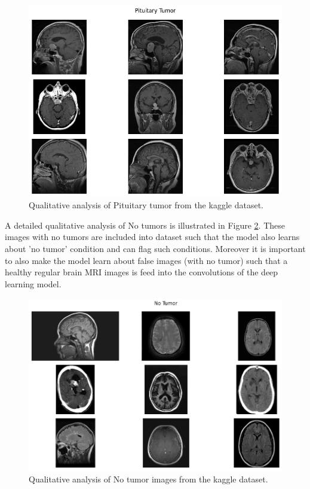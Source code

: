 \documentclass[12pt, a4paper,twoside]{report}
\theoremstyle{plain} %
\theoremstyle{definition} %
\theoremstyle{remark} %
\numberwithin{equation}{chapter}
\begin{document}
\begin{figure}
    \centering
    \includegraphics[scale=0.7]{Pituitary.png}
    \caption{Qualitative analysis of Pituitary tumor from the kaggle dataset.}
    \label{fig:Pituitary}
\end{figure}

A detailed qualitative analysis of No tumors is illustrated in Figure \ref{fig:no_tumor}. These images with no tumors are included into dataset such that the model also learns about 'no tumor' condition and can flag such conditions. Moreover it is important to also make the model learn about false images (with no tumor) such that a healthy regular brain MRI images is feed into the convolutions of the deep learning model.

\begin{figure}[h]
    \centering
    \includegraphics[scale=0.7]{no tumor.png}
    \caption{Qualitative analysis of No tumor images from the kaggle dataset.}
    \label{fig:no_tumor}
\end{figure}
\end{document}
